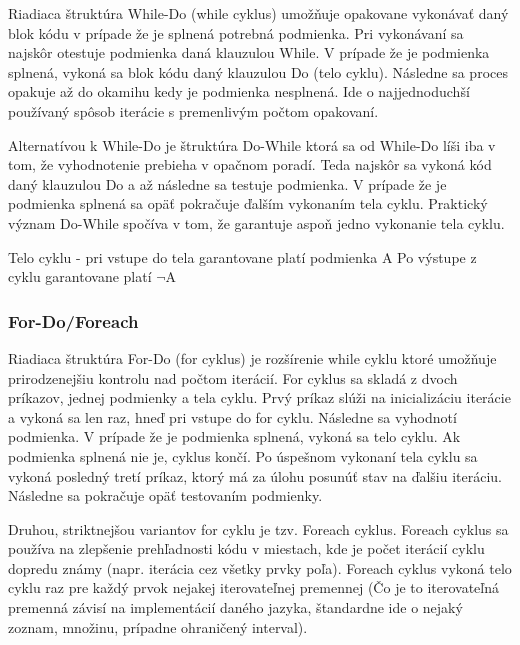 \documentclass[a4paper,10pt]{article}
\begin{document}
\begin{multicols}{2}
		Riadiaca štruktúra While-Do (while cyklus) umožňuje opakovane vykonávať daný blok kódu v prípade že je splnená potrebná podmienka. Pri vykonávaní sa najskôr otestuje podmienka daná klauzulou While. V prípade že je podmienka splnená, vykoná sa blok kódu daný klauzulou Do (telo cyklu). Následne sa proces opakuje až do okamihu kedy je podmienka nesplnená. Ide o najjednoduchší používaný spôsob iterácie s premenlivým počtom opakovaní.
		
		Alternatívou k While-Do je štruktúra Do-While ktorá sa od While-Do líši iba v tom, že vyhodnotenie prebieha v opačnom poradí. Teda najskôr sa vykoná kód daný klauzulou Do a až následne sa testuje podmienka. V prípade že je podmienka splnená sa opäť pokračuje ďalším vykonaním tela cyklu. Praktický význam Do-While spočíva v tom, že garantuje aspoň jedno vykonanie tela cyklu. 
		
		\begin{algorithm}
			\begin{algorithmic}[1]
					
					\State Telo cyklu - pri vstupe do tela garantovane platí podmienka A
				\EndWhile
				\State Po výstupe z cyklu garantovane platí $\neg$A
			\end{algorithmic}	
		\end{algorithm}	
		
	\subsubsection{For-Do/Foreach}
	
		Riadiaca štruktúra For-Do (for cyklus) je rozšírenie while cyklu ktoré umožňuje prirodzenejšiu kontrolu nad počtom iterácií. For cyklus sa skladá z dvoch príkazov, jednej podmienky a tela cyklu. Prvý príkaz slúži na inicializáciu iterácie a vykoná sa len raz, hneď pri vstupe do for cyklu. Následne sa vyhodnotí podmienka. V prípade že je podmienka splnená, vykoná sa telo cyklu. Ak podmienka splnená nie je, cyklus končí. Po úspešnom vykonaní tela cyklu sa vykoná posledný tretí príkaz, ktorý má za úlohu posunúť stav na ďalšiu iteráciu. Následne sa pokračuje opäť testovaním podmienky.
		
		Druhou, striktnejšou variantov for cyklu je tzv. Foreach cyklus. Foreach cyklus sa používa na zlepšenie prehľadnosti kódu v miestach, kde je počet iterácií cyklu dopredu známy (napr. iterácia cez všetky prvky poľa). Foreach cyklus vykoná telo cyklu raz pre každý prvok nejakej iterovateľnej premennej (Čo je to iterovateľná premenná závisí na implementácií daného jazyka, štandardne ide o nejaký zoznam, množinu, prípadne ohraničený interval).


\end{multicols}
\end{document}
